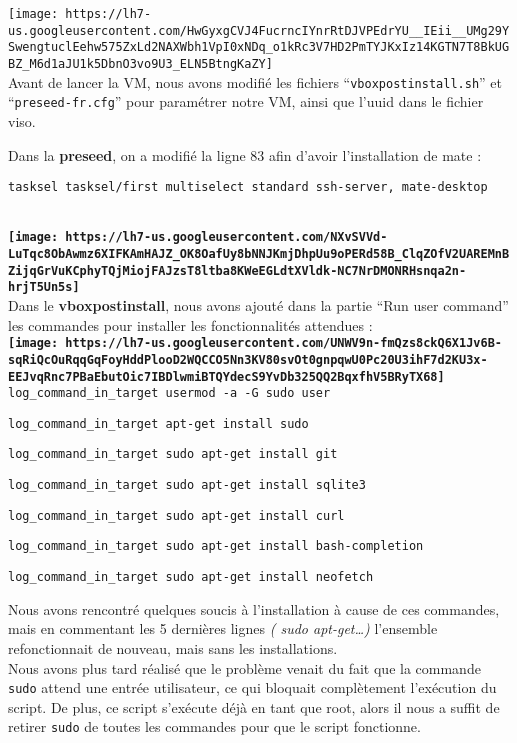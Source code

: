 \documentclass{report}
\begin{document}
\texttt{[image: https://lh7-us.googleusercontent.com/HwGyxgCVJ4FucrncIYnrRtDJVPEdrYU\_\_IEii\_\_UMg29YSwengtuclEehw575ZxLd2NAXWbh1VpI0xNDq\_o1kRc3V7HD2PmTYJKxIz14KGTN7T8BkUGBZ\_M6d1aJU1k5DbnO3vo9U3\_ELN5BtngKaZY]}\\
Avant de lancer la VM, nous avons modifié les fichiers
``\texttt{vboxpostinstall.sh}'' et ``\texttt{preseed-fr.cfg}'' pour
paramétrer notre VM, ainsi que l'uuid dans le fichier viso.

Dans la \textbf{preseed}, on a modifié la ligne 83 afin d'avoir
l'installation de mate :

\texttt{tasksel\ tasksel/first\ multiselect\ standard\ ssh-server,\ mate-desktop}\strut \\

\textbf{\texttt{[image: https://lh7-us.googleusercontent.com/NXvSVVd-LuTqc8ObAwmz6XIFKAmHAJZ\_OK8OafUy8bNNJKmjDhpUu9oPERd58B\_ClqZOfV2UAREMnBZijqGrVuKCphyTQjMiojFAJzsT8ltba8KWeEGLdtXVldk-NC7NrDMONRHsnqa2n-hrjT5Un5s]}}\\
Dans le \textbf{vboxpostinstall}, nous avons ajouté dans la partie ``Run
user command'' les commandes pour installer les fonctionnalités
attendues :\\
\textbf{\texttt{[image: https://lh7-us.googleusercontent.com/UNWV9n-fmQzs8ckQ6X1Jv6B-sqRiQcOuRqqGqFoyHddPlooD2WQCCO5Nn3KV80svOt0gnpqwU0Pc20U3ihF7d2KU3x-EEJvqRnc7PBaEbutOic7IBDlwmiBTQYdecS9YvDb325QQ2BqxfhV5BRyTX68]}}\\
\texttt{log\_command\_in\_target\ usermod\ -a\ -G\ sudo\ user}

\texttt{log\_command\_in\_target\ apt-get\ install\ sudo}

\texttt{log\_command\_in\_target\ sudo\ apt-get\ install\ git}

\texttt{log\_command\_in\_target\ sudo\ apt-get\ install\ sqlite3}

\texttt{log\_command\_in\_target\ sudo\ apt-get\ install\ curl}

\texttt{log\_command\_in\_target\ sudo\ apt-get\ install\ bash-completion}

\texttt{log\_command\_in\_target\ sudo\ apt-get\ install\ neofetch}

Nous avons rencontré quelques soucis à l'installation à cause de ces
commandes, mais en commentant les 5 dernières lignes \emph{( sudo
apt-get\ldots)} l'ensemble refonctionnait de nouveau, mais sans les
installations.\\
Nous avons plus tard réalisé que le problème venait du fait que la
commande \texttt{sudo} attend une entrée utilisateur, ce qui bloquait
complètement l'exécution du script. De plus, ce script s'exécute déjà en
tant que root, alors il nous a suffit de retirer \texttt{sudo} de toutes
les commandes pour que le script fonctionne.
\end{document}
